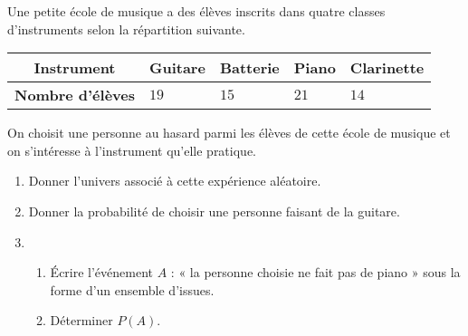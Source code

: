 \documentclass[11pt]{article}
\begin{document}
\begin{exo}[$2,5$ points]
 Une petite école de musique a des élèves inscrits dans quatre classes
 d'instruments selon la répartition suivante. 

 \begin{center}
   \renewcommand{\arraystretch}{1.2}
   \begin{tabularx}{0.9\textwidth}{|c|Y|Y|Y|Y|}
     \hline
     \textbf{Instrument} & Guitare & Batterie & Piano & Clarinette \\
     \hline
     \textbf{Nombre d'élèves} & $19$ & $15$ & $21$ & $14$ \\
     \hline
   \end{tabularx}
 \end{center}
 On choisit une personne au hasard parmi les élèves de cette école de musique et
 on s'intéresse à l'instrument qu'elle pratique.
 \begin{enumerate}
   \item Donner l'univers associé à cette expérience aléatoire.
   \item Donner la probabilité de choisir une personne faisant de la guitare.
   \item \begin{enumerate}
     \item Écrire l'événement $A$ : « la personne choisie ne fait pas de piano »
       sous la forme d'un ensemble d'issues.
     \item Déterminer $P(A)$.
   \end{enumerate}
 \end{enumerate}
\end{exo}
\end{document}
